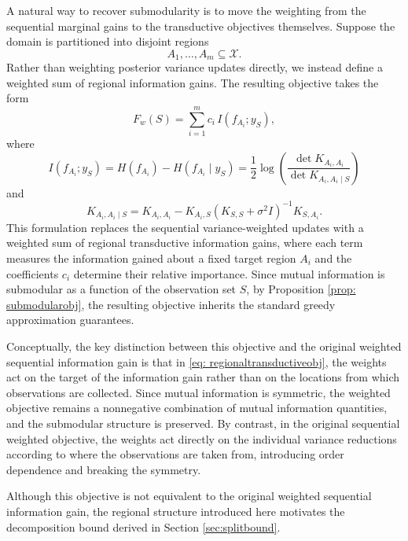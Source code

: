 A natural way to recover submodularity is to move the weighting from the sequential marginal gains to the transductive objectives themselves. Suppose the domain is partitioned into disjoint regions
\begin{equation*}
A_1,\dots,A_m \subseteq \mathcal{X}.
\end{equation*}
Rather than weighting posterior variance updates directly, we instead define a weighted sum of regional information gains. The resulting objective takes the form
\begin{equation} \label{eq: regionaltransductiveobj}
F_w(S)
=
\sum_{i=1}^m
c_i\, I(f_{A_i};y_S),
\end{equation}
where
\begin{equation*}
I(f_{A_i};y_S)
=
H(f_{A_i})
-
H(f_{A_i}\mid y_S)
=
\frac12
\log\!\left(
\frac{\det K_{A_i,A_i}}
{\det K_{A_i,A_i\mid S}}
\right)
\end{equation*}
and
\begin{equation*}
K_{A_i,A_i\mid S}
=
K_{A_i,A_i}
-
K_{A_i,S}
\left(
K_{S,S}+\sigma^2 I
\right)^{-1}
K_{S,A_i}.
\end{equation*}
This formulation replaces the sequential variance-weighted updates with a weighted sum of regional transductive information gains, where each term measures the information gained about a fixed target region $A_i$ and the coefficients $c_i$ determine their relative importance. Since mutual information is submodular as a function of the observation set $S$, by Proposition \ref{prop: submodularobj}, the resulting objective inherits the standard greedy approximation guarantees. 

Conceptually, the key distinction between this objective and the original weighted sequential information gain is that in \eqref{eq: regionaltransductiveobj}, the weights act on the target of the information gain rather than on the locations from which observations are collected. Since mutual information is symmetric, the weighted objective remains a nonnegative combination of mutual information quantities, and the submodular structure is preserved. By contrast, in the original sequential weighted objective, the weights act directly on the individual variance reductions according to where the observations are taken from, introducing order dependence and breaking the symmetry.

Although this objective is not equivalent to the original weighted sequential information gain, the regional structure introduced here motivates the decomposition bound derived in Section \ref{sec:splitbound}.
